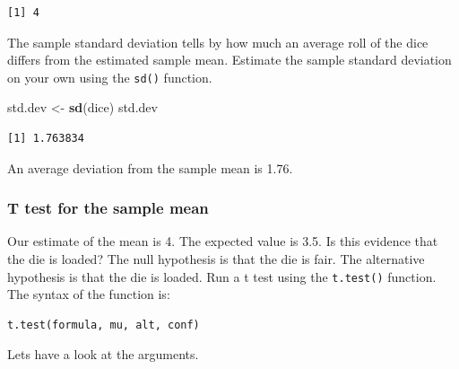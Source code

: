 \documentclass[]{article}
\newenvironment{Shaded}{\begin{snugshade}}{\end{snugshade}}
\newcommand{\KeywordTok}[1]{\textcolor[rgb]{0.13,0.29,0.53}{\textbf{#1}}}
\newcommand{\NormalTok}[1]{#1}
\newcommand{\StringTok}[1]{\textcolor[rgb]{0.31,0.60,0.02}{#1}}
\begin{document}
\begin{verbatim}
[1] 4
\end{verbatim}

The sample standard deviation tells by how much an average roll of the dice differs from the estimated sample mean. Estimate the sample standard deviation on your own using the \texttt{sd()} function.

\begin{Shaded}
\begin{Highlighting}[]
\NormalTok{std.dev <-}\StringTok{ }\KeywordTok{sd}\NormalTok{(dice)}
\NormalTok{std.dev}
\end{Highlighting}
\end{Shaded}

\begin{verbatim}
[1] 1.763834
\end{verbatim}

An average deviation from the sample mean is 1.76.

\hypertarget{t-test-for-the-sample-mean}{%
\subsubsection{T test for the sample mean}\label{t-test-for-the-sample-mean}}

Our estimate of the mean is 4. The expected value is 3.5. Is this evidence that the die is loaded? The null hypothesis is that the die is fair. The alternative hypothesis is that the die is loaded. Run a t test using the \texttt{t.test()} function. The syntax of the function is:

\begin{verbatim}
t.test(formula, mu, alt, conf)
\end{verbatim}

Lets have a look at the arguments.
\end{document}

